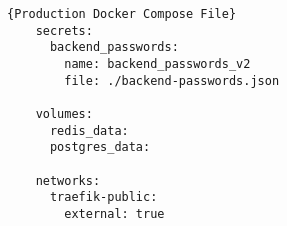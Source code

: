\begin{lstlisting}[caption=Production Docker Compose File, captionpos=b, style=htmlcssjs, label=dockerprod]{Production Docker Compose File}
    secrets:
      backend_passwords:
        name: backend_passwords_v2
        file: ./backend-passwords.json
      
    volumes:  
      redis_data:
      postgres_data:
    
    networks:
      traefik-public:
        external: true
    
  \end{lstlisting}



